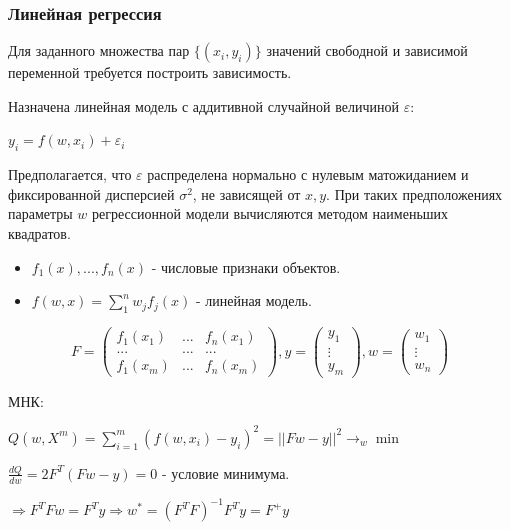 \documentclass{article}
\begin{document}
\subsubsection{Линейная регрессия}


Для заданного множества пар $\{(x_i, y_i)\}$ значений свободной и зависимой
переменной требуется построить зависимость.

Назначена линейная модель с аддитивной случайной величиной $\varepsilon$:

$y_i = f(w, x_i) + \varepsilon_i$

Предполагается, что $\varepsilon$ распределена нормально с нулевым матожиданием
и фиксированной дисперсией $\sigma^2$, не зависящей от $x, y$. При таких
предположениях параметры $w$ регрессионной модели вычисляются методом наименьших
квадратов.

\begin{itemize}
	\item $f_1(x), ..., f_n(x)$ - числовые признаки объектов.
	\item $f(w, x) = \sum\limits_1^n w_j f_j(x)$ - линейная модель.
\end{itemize}

\begin{equation}
	F =
	\begin{pmatrix}
		f_1(x_1) & ... & f_n(x_1) \\
		... & ... & ... \\
		f_1(x_m) & ... & f_n(x_m)
	\end{pmatrix},
	y = 
	\begin{pmatrix}
		y_1 \\
		\vdots \\
		y_m
	\end{pmatrix},
	w =
	\begin{pmatrix}
		w_1 \\
		\vdots \\
		w_n
	\end{pmatrix}
\end{equation}

МНК:

$Q(w, X^m) = \sum\limits_{i=1}^m (f(w, x_i) - y_i)^2 = ||F w - y||^2 \to_w \min$

$\frac{d Q}{d w} = 2F^T(F w - y) = 0$ - условие минимума.

$\Rightarrow F^T F w = F^T y \Rightarrow w^* = (F^T F)^{-1}F^T y = F^+ y$
\end{document}
